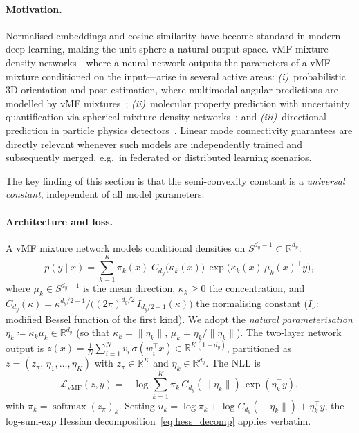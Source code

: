 \documentclass[11pt]{article}
\DeclareMathOperator{\softmax}{softmax}
\newcommand{\R}{\mathbb{R}}
\newcommand{\cL}{\mathcal{L}}
\DeclareMathOperator{\vmf}{vMF}
\begin{document}
\paragraph{Motivation.}
Normalised embeddings and cosine similarity have become standard in
modern deep learning, making the unit sphere a natural output space.
vMF mixture density networks---where a neural network outputs the
parameters of a vMF mixture conditioned on the input---arise in
several active areas:
\emph{(i)}~probabilistic 3D orientation and pose estimation, where
multimodal angular predictions are modelled by vMF
mixtures~\cite{prokudin2018deep,liu2024probabilistic};
\emph{(ii)}~molecular property prediction with uncertainty
quantification via spherical mixture density
networks~\cite{han2023sphericalmdn};
and \emph{(iii)}~directional prediction in particle physics
detectors~\cite{ghrear2024direction}.
Linear mode connectivity guarantees are directly relevant whenever
such models are independently trained and subsequently merged, e.g.\
in federated or distributed learning scenarios.

The key finding of this section is that the semi-convexity constant
is a \emph{universal constant}, independent of all model parameters.

\paragraph{Architecture and loss.}
A vMF mixture network models conditional densities on
$S^{d_y-1} \subset \R^{d_y}$:
\[
  p(y \mid x) = \sum_{k=1}^K \pi_k(x)\;
  C_{d_y}\!\bigl(\kappa_k(x)\bigr)\,
  \exp\!\bigl(\kappa_k(x)\,\mu_k(x)^\top y\bigr),
\]
where $\mu_k \in S^{d_y-1}$ is the mean direction,
$\kappa_k \ge 0$ the concentration, and
$C_{d_y}(\kappa) =
\kappa^{d_y/2-1}\bigl/\bigl((2\pi)^{d_y/2}\,
I_{d_y/2-1}(\kappa)\bigr)$
the normalising constant
($I_\nu$: modified Bessel function of the first kind).
We adopt the \emph{natural parameterisation}
$\eta_k \coloneqq \kappa_k\mu_k \in \R^{d_y}$
(so that $\kappa_k=\|\eta_k\|$, $\mu_k=\eta_k/\|\eta_k\|$).
The two-layer network output is
$z(x) = \frac{1}{N}\sum_{i=1}^N v_i\,\sigma(w_i^\top x)
\in \R^{K(1+d_y)}$,
partitioned as $z = (z_\pi,\,\eta_1,\ldots,\eta_K)$ with
$z_\pi \in \R^K$ and $\eta_k \in \R^{d_y}$.
The NLL is
\begin{equation}\label{eq:vmf_loss}
  \cL_{\vmf}(z,y)
  = -\log\sum_{k=1}^K \pi_k\,
    C_{d_y}(\|\eta_k\|)\,\exp(\eta_k^\top y),
\end{equation}
with $\pi_k = \softmax(z_\pi)_k$.
Setting $u_k = \log\pi_k + \log C_{d_y}(\|\eta_k\|) + \eta_k^\top y$,
the log-sum-exp Hessian
decomposition~\eqref{eq:hess_decomp} applies verbatim.
\end{document}
